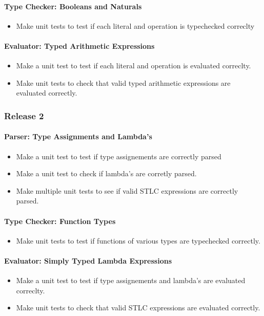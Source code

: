 \documentclass[pdftex,a4paper,11pt]{article}
\begin{document}
\paragraph{Type Checker: Booleans and Naturals}
\begin{itemize}
  \item Make unit tests to test if each literal and operation is typechecked correclty
\end{itemize}

\paragraph{Evaluator: Typed Arithmetic Expressions}
\begin{itemize}
  \item Make a unit test to test if each literal and operation is evaluated correclty.
  \item Make unit tests to check that valid typed arithmetic expressions are evaluated correctly.
\end{itemize}

\subsubsection{Release 2}

\paragraph{Parser: Type Assignments and Lambda's}
\begin{itemize}
  \item Make a unit test to test if type assignements are correctly parsed
  \item Make a unit test to check if lambda's are corretly parsed. 
  \item Make multiple unit tests to see if valid STLC expressions are correctly parsed. 
\end{itemize}

\paragraph{Type Checker: Function Types}
\begin{itemize}
  \item Make unit tests to test if functions of various types are typechecked correctly.
\end{itemize}

\paragraph{Evaluator: Simply Typed Lambda Expressions}
\begin{itemize}
  \item Make a unit test to test if type assignements and lambda's are evaluated correclty.
  \item Make unit tests to check that valid STLC expressions are evaluated correctly.
\end{itemize}
\end{document}
